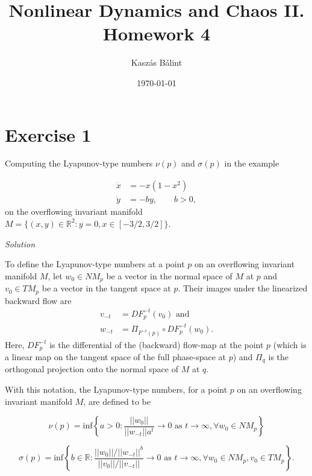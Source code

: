 \documentclass[a4paper,11pt,pdftex]{article}
\title{Nonlinear Dynamics and Chaos II. \\ Homework 4}
\author{Kaszás Bálint}
\date{\today}
\begin{document}
\pagestyle{fancy}

\maketitle


\section*{Exercise 1}
Computing the Lyapunov-type numbers $\nu(p)$ and $\sigma(p)$ in the example

\begin{align}
\label{eq1}\dot{x} &= -x(1-x^2) \\
\label{eq2}\dot{y} &= -by, \qquad b>0,
\end{align}
on the overflowing invariant manifold $M = \{ (x,y) \in \mathbb{R}^2 : y = 0, x\in [-3/2, 3/2]\}$.

\emph{Solution}

To define the Lyapunov-type numbers at a point $p$ on an overflowing invariant manifold $M$, let $w_0\in NM_p$ be a vector in the normal space of $M$ at $p$ and $v_0\in TM_p$ be a vector in the tangent space at $p$. Their images under the linearized backward flow are 
\begin{align*}
    v_{-t} &= DF^{-t}_p(v_0) \text{ and } \\
    w_{-t} &= \Pi_{F^{-t}(p)}\circ DF^{-t}_p(w_0). 
\end{align*}
Here, $DF^{-t}_p$ is the differential of the (backward) flow-map at the point $p$ (which is a linear map on the tangent space of the full phase-space at $p$) and $\Pi_q$ is the orthogonal projection onto the normal space of $M$ at $q$. 


With this notation, the Lyapunov-type numbers, for a point $p$ on an overflowing invariant manifold $M$, are defined to be

\begin{equation}
    \nu(p) = \text{inf}\left\{a>0: \frac{||w_{0}||}{|| w_{-t}||a^t} \to 0 \text{ as } t \to \infty, \forall w_0 \in NM_p \right\}
\end{equation}

\begin{equation}
    \sigma(p) = \text{inf} \left\{ b \in \mathbb{R}: \frac{||w_0||/ ||w_{-t}||^b}{||v_0||/||v_{-t}||} \to 0 \text{ as } t\to \infty, \forall w_0\in NM_p, v_0 \in TM_p \right\}.
\end{equation}
\end{document}
